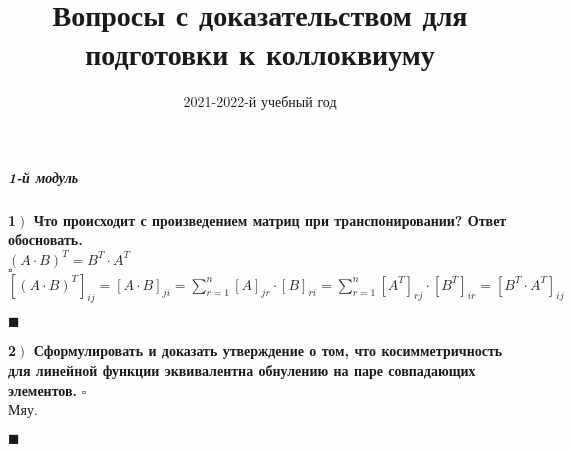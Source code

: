 \documentclass[a4paper,12pt]{article}
\author{2021-2022-й учебный год}
\title{Вопросы с доказательством для подготовки к коллоквиуму}
\date{}
\begin{document}
    \maketitle

    \subparagraph{1-й модуль}
    \textbf{1$\left.\right)$ Что происходит с произведением матриц при транспонировании? Ответ обосновать.} \\$(A\cdot B)^T=B^T\cdot A^T$\\
    $\square$\\
    $[(A\cdot B)^T]_{ij}=[A\cdot B]_{ji}=\sum\limits_{r=1}^n [A]_{jr}\cdot[B]_{ri} = \sum\limits_{r=1}^n [A^T]_{rj}\cdot[B^T]_{ir} = [B^T\cdot A^T]_{ij}$
    \begin{flushright}
        $\blacksquare$
    \end{flushright}

    \textbf{2$\left.\right)$ Сформулировать и доказать утверждение о том, что косимметричность для линейной функции эквивалентна обнулению на паре совпадающих элементов.}
    $\square$\\
    Мяу.
    \begin{flushright}
        $\blacksquare$
    \end{flushright}
\end{document}
